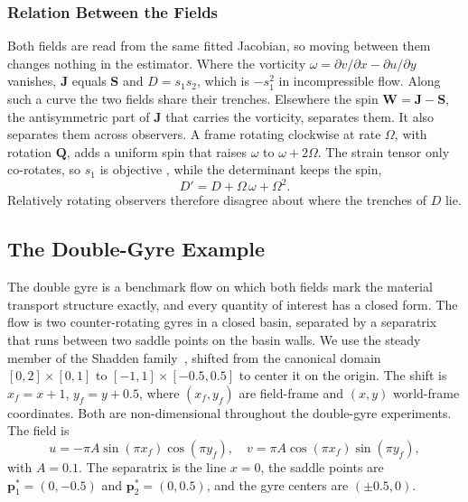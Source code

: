 \documentclass[lettersize,journal]{IEEEtran}
\begin{document}
\subsubsection{Relation Between the Fields}
Both fields are read from the same fitted Jacobian, so moving between
them changes nothing in the estimator. Where the vorticity
$\omega = \partial v/\partial x - \partial u/\partial y$ vanishes,
$\mathbf{J}$ equals $\mathbf{S}$ and $D = s_1 s_2$, which is $-s_1^2$ in
incompressible flow. Along such a curve the two fields share their
trenches. Elsewhere the spin $\mathbf{W} = \mathbf{J} - \mathbf{S}$, the
antisymmetric part of $\mathbf{J}$ that carries the vorticity, separates
them. It also separates them across observers. A frame rotating clockwise at rate
$\Omega$, with rotation $\mathbf{Q}$, adds a uniform spin that raises
$\omega$ to $\omega + 2\Omega$. The strain tensor only co-rotates, so
$s_1$ is objective \cite{19}, while the determinant keeps the spin,
\begin{equation}
    D' = D + \Omega\,\omega + \Omega^2 .
    \label{eq:D_not_objective}
\end{equation}
Relatively rotating observers therefore disagree about where the
trenches of $D$ lie. 

\subsection{The Double-Gyre Example}
\label{sec:dg_example}

The double gyre is
a benchmark flow on which both fields mark the material transport structure
exactly, and every
quantity of interest has a closed form. The flow is two counter-rotating gyres in a
closed basin, separated by a separatrix that runs between two saddle points on
the basin walls. We use the steady member of the Shadden
family~\cite{17}, shifted from the canonical domain
$[0,2]\times[0,1]$ to $[-1,1]\times[-0.5,0.5]$ to center it on the origin. The
shift is $x_f = x + 1$, $y_f = y + 0.5$, where $(x_f, y_f)$ are field-frame and
$(x, y)$ world-frame coordinates. Both are non-dimensional throughout the
double-gyre experiments. The field is
\begin{equation}
u = -\pi A \sin(\pi x_f)\cos(\pi y_f), \quad
v = \pi A \cos(\pi x_f)\sin(\pi y_f),
\label{eq:dg_u}
\end{equation}
with $A = 0.1$. The separatrix is the line $x = 0$, the saddle points are
$\mathbf{p}_1^* = (0, -0.5)$ and $\mathbf{p}_2^* = (0, 0.5)$, and the gyre
centers are $(\pm 0.5, 0)$.
\end{document}
